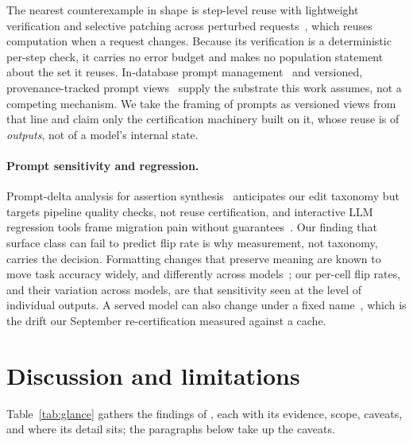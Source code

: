 The nearest counterexample in shape is step-level reuse with lightweight
verification and selective patching across perturbed
requests~\cite{stepcache}, which reuses computation when a request
changes. Because its verification is a deterministic per-step check, it
carries no error budget and makes no population statement about the set
it reuses. In-database prompt management~\cite{promptdb} and versioned,
provenance-tracked prompt views~\cite{spear} supply the substrate this
work assumes, not a competing mechanism. We take the framing of prompts
as versioned views from that line and claim only the certification
machinery built on it, whose reuse is of \emph{outputs}, not of a
model's internal state.

\keeprunin
\paragraph{Prompt sensitivity and regression.} Prompt-delta analysis for
assertion synthesis~\cite{spade} anticipates our edit taxonomy but
targets pipeline quality checks, not reuse certification, and
interactive LLM regression tools frame migration pain without
guarantees~\cite{retain}. Our finding that surface class can fail to predict flip rate is why
measurement, not taxonomy, carries the decision. Formatting changes that preserve meaning are known to move
task accuracy widely, and differently across models~\cite{sclar}; our
per-cell flip rates, and their variation across models, are that
sensitivity seen at the level of individual outputs. A served model can
also change under a fixed name~\cite{chendrift}, which is the drift our
September re-certification measured against a cache.

\keepheading
\section{Discussion and limitations}
\label{sec:limits}

Table~\ref{tab:glance} gathers the findings of ,
each with its evidence, scope, caveats, and where its detail sits; the
paragraphs below take up the caveats.

